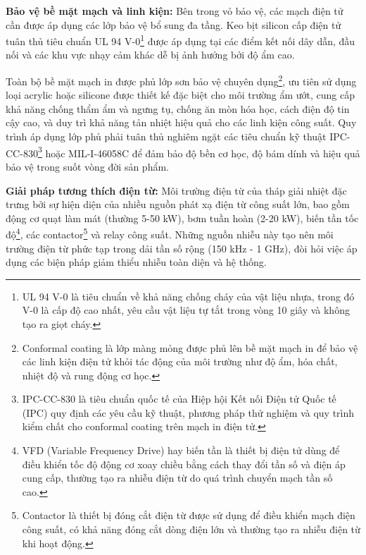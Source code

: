 \documentclass[../main.tex]{subfiles}
\begin{document}
\textbf{Bảo vệ bề mặt mạch và linh kiện:} Bên trong vỏ bảo vệ, các mạch điện tử cần được áp dụng các lớp bảo vệ bổ sung đa tầng. Keo bịt silicon cấp điện tử tuân thủ tiêu chuẩn UL 94 V-0\footnote{UL 94 V-0 là tiêu chuẩn về khả năng chống cháy của vật liệu nhựa, trong đó V-0 là cấp độ cao nhất, yêu cầu vật liệu tự tắt trong vòng 10 giây và không tạo ra giọt cháy.} được áp dụng tại các điểm kết nối dây dẫn, đầu nối và các khu vực nhạy cảm khác dễ bị ảnh hưởng bởi độ ẩm cao. 

Toàn bộ bề mặt mạch in được phủ lớp sơn bảo vệ chuyên dụng\footnote{Conformal coating là lớp màng mỏng được phủ lên bề mặt mạch in để bảo vệ các linh kiện điện tử khỏi tác động của môi trường như độ ẩm, hóa chất, nhiệt độ và rung động cơ học.}, ưu tiên sử dụng loại acrylic hoặc silicone được thiết kế đặc biệt cho môi trường ẩm ướt, cung cấp khả năng chống thẩm ẩm và ngưng tụ, chống ăn mòn hóa học, cách điện độ tin cậy cao, và duy trì khả năng tản nhiệt hiệu quả cho các linh kiện công suất. Quy trình áp dụng lớp phủ phải tuân thủ nghiêm ngặt các tiêu chuẩn kỹ thuật IPC-CC-830\footnote{IPC-CC-830 là tiêu chuẩn quốc tế của Hiệp hội Kết nối Điện tử Quốc tế (IPC) quy định các yêu cầu kỹ thuật, phương pháp thử nghiệm và quy trình kiểm chất cho conformal coating trên mạch in điện tử.} hoặc MIL-I-46058C để đảm bảo độ bền cơ học, độ bám dính và hiệu quả bảo vệ trong suốt vòng đời sản phẩm.

\textbf{Giải pháp tương thích điện từ:} Môi trường điện từ của tháp giải nhiệt đặc trưng bởi sự hiện diện của nhiều nguồn phát xạ điện từ công suất lớn, bao gồm động cơ quạt làm mát (thường 5-50 kW), bơm tuần hoàn (2-20 kW), biến tần tốc độ\footnote{VFD (Variable Frequency Drive) hay biến tần là thiết bị điện tử dùng để điều khiển tốc độ động cơ xoay chiều bằng cách thay đổi tần số và điện áp cung cấp, thường tạo ra nhiễu điện từ do quá trình chuyển mạch tần số cao.}, các contactor\footnote{Contactor là thiết bị đóng cắt điện từ được sử dụng để điều khiển mạch điện công suất, có khả năng đóng cắt dòng điện lớn và thường tạo ra nhiễu điện từ khi hoạt động.} và relay công suất. Những nguồn nhiễu này tạo nên môi trường điện từ phức tạp trong dải tần số rộng (150 kHz - 1 GHz), đòi hỏi việc áp dụng các biện pháp giảm thiểu nhiễu toàn diện và hệ thống.
\end{document}
